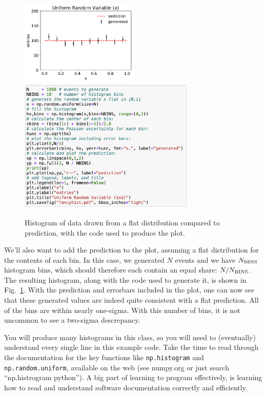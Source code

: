 \begin{figure}[htbp]
 \begin{center}
  \includegraphics[width=0.50\textwidth]{figs/monte_carlo/fancyhist.pdf}
  \includegraphics[width=0.75\textwidth]{figs/monte_carlo/fancyhist-code.png}
\caption{Histogram of data drawn from a flat distribution compared to prediction, with the code used to produce the plot.}
\label{fig:fancyhist}
\end{center}
\end{figure}

We'll also want to add the prediction to the plot, assuming a flat
distribution for the contents of each bin.  In this case, we generated
$N$ events and we have $N_{\rm BINS}$ histogram bins, which should
therefore each contain an equal share: $N / N_{\rm BINS}$.  The
resulting histogram, along with the code used to generate it, is shown
in Fig.~\ref{fig:fancyhist}.  With the prediction and errorbars
included in the plot, one can now see that these generated values are
indeed quite consistent with a flat prediction. All of the bins are
within nearly one-sigma. With this number of bins, it is not uncommon
to see a two-sigma descrepancy.

You will produce many histograms in this class, so you will need to
(eventually) understand every single line in this example code.  Take
the time to read through the documentation for the key functions like
{\tt np.histogram} and {\tt np.random.uniform}, available on the web
(see numpy.org or just search ``np.histrogram python'').  A big part
of learning to program effectively, is learning how to read and
understand software documentation correctly and efficiently.

